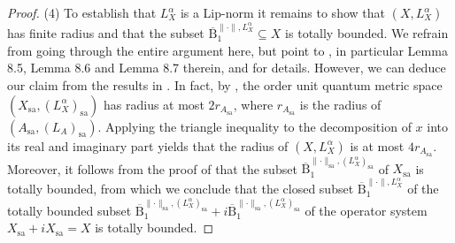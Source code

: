 \documentclass{amsart}
\theoremstyle{plain}
\theoremstyle{definition}
\theoremstyle{remark}
\begin{document}
\begin{proof}
		(4)		
		To establish that $L_X^\alpha$ is a Lip-norm it remains to show that $(X,L_X^\alpha)$ has finite radius and that the subset $\overline{\mathrm{B}}_1^{\lVert\cdot\rVert,L_X^\alpha} \subseteq X$ is totally bounded.
		We refrain from going through the entire argument here, but point to \cite[Section 8]{Li09}, in particular Lemma 8.5, Lemma 8.6 and Lemma 8.7 therein, and \cite[Section 2.5]{Sai09} for details.
		However, we can deduce our claim from the results in \cite{Sai09}.
		In fact, by \cite[Lemma 2.19]{Sai09}, the order unit quantum metric space $(X_\mathrm{sa},(L_X^\alpha)_\mathrm{sa})$ has radius at most $2 r_{A_\mathrm{sa}}$, where $r_{A_\mathrm{sa}}$ is the radius of $(A_\mathrm{sa},(L_A)_\mathrm{sa})$.
		Applying the triangle inequality to the decomposition of $x$ into its real and imaginary part yields that the radius of $(X,L_X^\alpha)$ is at most $4r_{A_\mathrm{sa}}$.
		Moreover, it follows from the proof of \cite[Proposition 2.18]{Sai09} that the subset $\overline{\mathrm{B}}_1^{\lVert\cdot\rVert_{\mathrm{sa}},(L_X^\alpha)_\mathrm{sa}}$ of $X_{\mathrm{sa}}$ is totally bounded, from which we conclude that the closed subset $\overline{\mathrm{B}}_1^{\lVert\cdot\rVert,L_X^\alpha}$ of the totally bounded subset $\overline{\mathrm{B}}_1^{\lVert\cdot\rVert_{\mathrm{sa}},(L_X^\alpha)_\mathrm{sa}} + i\overline{\mathrm{B}}_1^{\lVert\cdot\rVert_{\mathrm{sa}},(L_X^\alpha)_\mathrm{sa}}$ of the operator system $X_\mathrm{sa}+iX_\mathrm{sa} = X$ is totally bounded.
	\end{proof}
	
\end{document}
